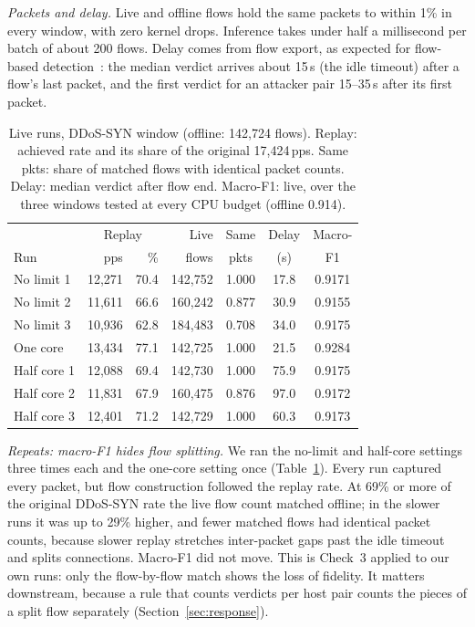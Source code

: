 \emph{Packets and delay.} Live and offline flows hold the same packets to within 1\% in every window, with zero kernel drops. Inference takes under half a millisecond per batch of about 200 flows. Delay comes from flow export, as expected for flow-based detection~\cite{hofstede2013realtime}: the median verdict arrives about 15\,s (the idle timeout) after a flow's last packet, and the first verdict for an attacker pair 15--35\,s after its first packet.

\begin{table}[t]
\centering
\caption{Live runs, DDoS-SYN window (offline: 142,724 flows). Replay: achieved rate and its share of the original 17,424\,pps. Same pkts: share of matched flows with identical packet counts. Delay: median verdict after flow end. Macro-F1: live, over the three windows tested at every CPU budget (offline 0.914).}
\label{tab:repeats}
\footnotesize
\setlength{\tabcolsep}{2.5pt}
\begin{tabular}{lrrrccc}
\hline
 & \multicolumn{2}{c}{Replay} & Live & Same & Delay & Macro- \\
Run & pps & \% & flows & pkts & (s) & F1 \\
\hline
No limit 1  & 12,271 & 70.4 & 142,752 & 1.000 & 17.8 & 0.9171 \\
No limit 2  & 11,611 & 66.6 & 160,242 & 0.877 & 30.9 & 0.9155 \\
No limit 3  & 10,936 & 62.8 & 184,483 & 0.708 & 34.0 & 0.9175 \\
One core    & 13,434 & 77.1 & 142,725 & 1.000 & 21.5 & 0.9284 \\
Half core 1 & 12,088 & 69.4 & 142,730 & 1.000 & 75.9 & 0.9175 \\
Half core 2 & 11,831 & 67.9 & 160,475 & 0.876 & 97.0 & 0.9172 \\
Half core 3 & 12,401 & 71.2 & 142,729 & 1.000 & 60.3 & 0.9173 \\
\hline
\end{tabular}
\end{table}

\emph{Repeats: macro-F1 hides flow splitting.} We ran the no-limit and half-core settings three times each and the one-core setting once (Table~\ref{tab:repeats}). Every run captured every packet, but flow construction followed the replay rate. At 69\% or more of the original DDoS-SYN rate the live flow count matched offline; in the slower runs it was up to 29\% higher, and fewer matched flows had identical packet counts, because slower replay stretches inter-packet gaps past the idle timeout and splits connections. Macro-F1 did not move. This is Check~3 applied to our own runs: only the flow-by-flow match shows the loss of fidelity. It matters downstream, because a rule that counts verdicts per host pair counts the pieces of a split flow separately (Section~\ref{sec:response}).

